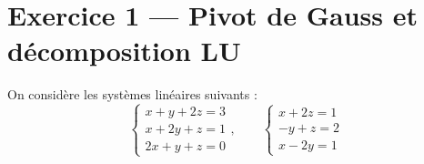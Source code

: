\section*{Exercice 1 --- Pivot de Gauss et décomposition LU}
On considère les systèmes linéaires suivants :
$$
\left\{\begin{array}{l}
x+y+2 z=3 \\
x+2 y+z=1 \\
2 x+y+z=0
\end{array}\right., \qquad 
\left\{\begin{array}{l}
x+2 z=1 \\
-y+z=2 \\
x-2 y=1
\end{array}\right.
$$

